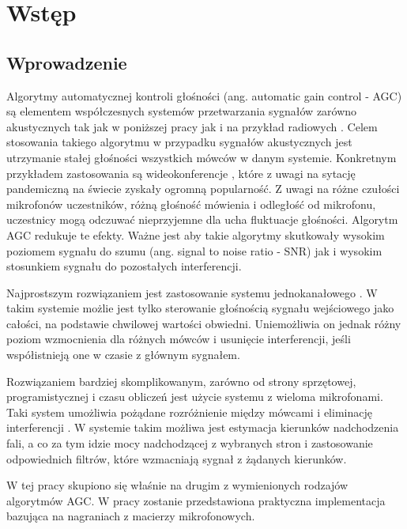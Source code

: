 \chapter{Wstęp}
\section{Wprowadzenie}

Algorytmy automatycznej kontroli głośności (ang. automatic gain control - AGC) są elementem współczesnych systemów przetwarzania sygnałów zarówno akustycznych tak jak w poniższej pracy jak i na przykład radiowych \cite{agc_5g}. Celem stosowania takiego algorytmu w przypadku sygnałów akustycznych jest utrzymanie stałej głośności wszystkich mówców w danym systemie. Konkretnym przykładem zastosowania są wideokonferencje \cite{agc_application}, które z uwagi na sytację pandemiczną na świecie zyskały ogromną popularność. Z uwagi na różne czułości mikrofonów uczestników, różną głośność mówienia i odległość od mikrofonu, uczestnicy mogą odczuwać nieprzyjemne dla ucha fluktuacje głośności. Algorytm AGC redukuje te efekty. Ważne jest aby takie algorytmy skutkowały wysokim poziomem sygnału do szumu (ang. signal to noise ratio - SNR) jak i wysokim stosunkiem sygnału do pozostałych interferencji.

Najprostszym rozwiązaniem jest zastosowanie systemu jednokanałowego \cite{Archibald2008}. W takim systemie możlie jest tylko sterowanie głośnością sygnału wejściowego jako całości, na podstawie chwilowej wartości obwiedni. Uniemożliwia on jednak różny poziom wzmocnienia dla różnych mówców i usunięcie interferencji, jeśli współistnieją one w czasie z głównym sygnałem.

Rozwiązaniem bardziej skomplikowanym, zarówno od strony sprzętowej, programistycznej i czasu obliczeń jest użycie systemu z wieloma mikrofonami. Taki system umożliwia pożądane rozróżnienie między mówcami i eliminację interferencji \cite{Thiergart2013}. W systemie takim możliwa jest estymacja kierunków nadchodzenia fali, a co za tym idzie mocy nadchodzącej z wybranych stron i zastosowanie odpowiednich filtrów, które wzmacniają sygnał z żądanych kierunków.

W tej pracy skupiono się właśnie na drugim z wymienionych rodzajów algorytmów AGC. W pracy zostanie przedstawiona praktyczna implementacja bazująca na nagraniach z macierzy mikrofonowych.

